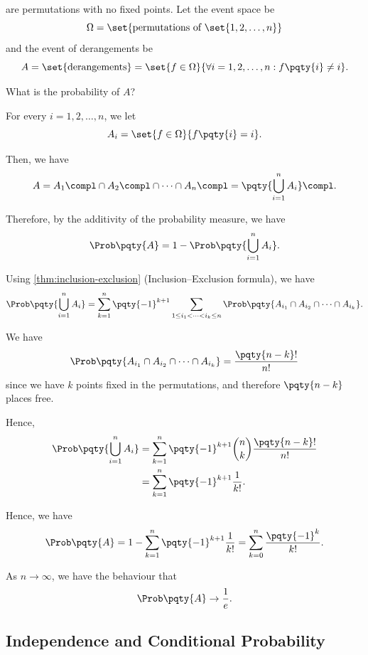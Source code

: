 \begin{example}[Derangements]
    \label{ex:derangements}%
     are permutations with no fixed points. Let the event space be
    \[
        \Omega = \set{\text{permutations of }\set{1, 2, \ldots, n}}
    \]
    and the event of derangements be
    \[
        A = \set{\text{derangements}} = \set{f \in \Omega}{\forall i = 1, 2, \ldots, n: f\pqty{i} \neq i}.
    \]

    What is the probability of \(A\)?

    For every \(i = 1, 2, \ldots, n\), we let
    \[
        A_i = \set{f \in \Omega}{f\pqty{i} = i}.
    \]

    Then, we have
    \[
        A = A_1\compl \cap A_2\compl \cap \cdots \cap A_n\compl = \pqty{\bigcup_{i = 1}^{n} A_i} \compl.
    \]

    Therefore, by the additivity of the probability measure, we have
    \[
        \Prob\pqty{A} = 1 - \Prob\pqty{\bigcup_{i = 1}^{n} A_i}.
    \]

    Using \autoref{thm:inclusion-exclusion} (Inclusion--Exclusion formula), we have
    \[
        \Prob\pqty{\bigcup_{i = 1}^{n} A_i} = \sum_{k = 1}^{n} \pqty{-1}^{k + 1} \sum_{1 \leq i_1 < \cdots < i_k \leq n} \Prob\pqty{A_{i_1} \cap A_{i_2} \cap \cdots \cap A_{i_k}}.
    \]

    We have
    \[
        \Prob\pqty{A_{i_1} \cap A_{i_2} \cap \cdots \cap A_{i_k}} = \frac{\pqty{n - k}!}{n!}
    \]
    since we have \(k\) points fixed in the permutations, and therefore \(\pqty{n - k}\) places free.
    
    Hence,
    \begin{align*}
        \Prob\pqty{\bigcup_{i = 1}^{n} A_i} &= \sum_{k = 1}^{n} \pqty{-1}^{k + 1} \binom{n}{k} \frac{\pqty{n - k}!}{n!} \\
        &= \sum_{k = 1}^{n} \pqty{-1}^{k + 1} \frac{1}{k!}.
    \end{align*}

    Hence, we have
    \[
        \Prob\pqty{A} = 1 - \sum_{k = 1}^{n} \pqty{-1}^{k + 1} \frac{1}{k!} = \sum_{k = 0}^{n} \frac{\pqty{-1}^{k}}{k!}.
    \]

    As \(n \to \infty\), we have the behaviour that
    \[
        \Prob\pqty{A} \to \frac{1}{e}.
    \]
\end{example}

\subsection{Independence and Conditional Probability}

